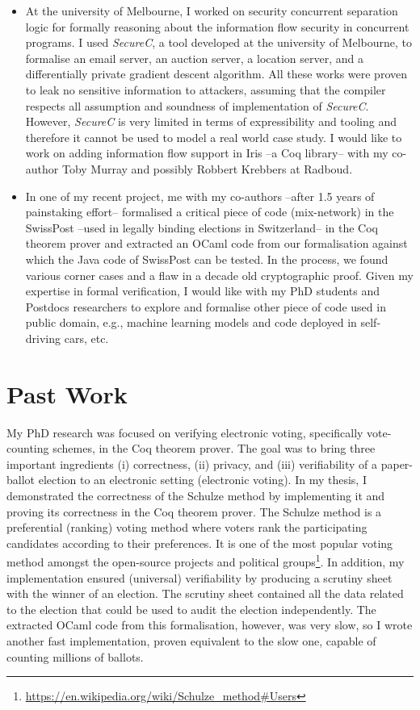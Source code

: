 \documentclass[a4paper]{article}
\begin{document}
\begin{itemize}
\item At the university of Melbourne, I worked on 
security concurrent separation logic for formally reasoning about the information 
flow security in concurrent programs. I used \textit{SecureC}, a tool developed at the university of 
Melbourne, to formalise an email server, an auction server, a location server, and 
a differentially private gradient descent algorithm. 
All these works were proven to leak no sensitive 
information to attackers, assuming that the compiler respects all 
assumption and soundness of implementation of \textit{SecureC}. However, 
\textit{SecureC} is very limited in terms of expressibility and tooling 
and therefore it cannot be used to model a real world case study. I would like to work on 
adding information flow support in Iris --a Coq library-- with my co-author Toby Murray 
and possibly Robbert Krebbers at Radboud. 


\item In one of my recent project, me with my co-authors --after 1.5 years of 
painstaking effort-- formalised a critical 
piece of code (mix-network) in the SwissPost --used in legally binding elections 
in Switzerland-- in the Coq theorem prover and extracted an OCaml code from our 
formalisation against which the Java code of SwissPost can be tested. 
In the process, we found various 
corner cases and a flaw in a decade old cryptographic proof.  Given my 
expertise in formal verification, I would like with my PhD students and 
Postdocs researchers to explore and formalise other 
piece of code used in public domain, e.g., machine learning 
models and code deployed in self-driving cars, etc. 


\end{itemize}	

\section{Past Work}
My PhD research was focused on verifying electronic voting, specifically vote-counting schemes, in 
the Coq theorem prover. The goal was to 
bring  three important ingredients (i) correctness, (ii) privacy, and (iii) verifiability of a 
paper-ballot election to 
an electronic setting (electronic voting).
In my thesis, I demonstrated the correctness of the Schulze method 
by implementing it and proving its correctness in the Coq theorem 
prover. The Schulze method is a preferential (ranking) voting method where voters rank the participating 
candidates according to their preferences. It is one of the most popular voting method amongst the open-source projects and 
political groups\footnote{\url{https://en.wikipedia.org/wiki/Schulze_method#Users}}.
In addition, my implementation 
ensured (universal) verifiability by producing a scrutiny sheet 
with the winner of an election. The scrutiny sheet contained all the data related 
to the election that could be used to audit the election independently. 
The extracted OCaml code from this formalisation, however, was 
very slow, so I wrote another fast implementation, proven equivalent to the slow one,
capable of counting millions of ballots.
\end{document}
